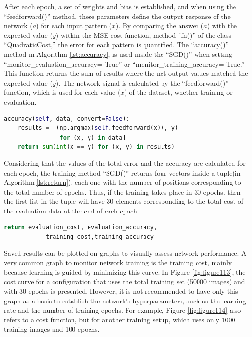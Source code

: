 After each epoch, a set of weights and bias is established, and when using the “feedforward()” method, these parameters define the output response of the network ($a$) for each input pattern ($x$). By comparing the answer ($a$) with the expected value ($y$) within the MSE cost function, method “fn()” of the class “QuadraticCost,” the error for each pattern is quantified. The “accuracy()” method in Algorithm \ref{lst:accuracy}, is used inside the “SGD()” when setting “monitor\_evaluation\_accuracy= True” or “monitor\_training\_accuracy= True.” This function returns the sum of results where the net output values matched the expected value ($y$). The network signal is calculated by the “feedforward()” function, which is used for each value ($x$) of the dataset, whether training or evaluation.

\begin{lstlisting}[caption={accuracy() method in Python},label={lst:accuracy},language=Python]
accuracy(self, data, convert=False):
    results = [(np.argmax(self.feedforward(x)), y) 
                for (x, y) in data]
    return sum(int(x == y) for (x, y) in results)
\end{lstlisting}

Considering that the values of the total error and the accuracy are calculated for each epoch, the training method “SGD()” returns four vectors inside a tuple(in Algorithm \ref{lst:return}), each one with the number of positions corresponding to the total number of epochs. Thus, if the training takes place in 30 epochs, then the first list in the tuple will have 30 elements corresponding to the total cost of the evaluation data at the end of each epoch.

\begin{lstlisting}[caption={Delta method in Python},label={lst:return},language=Python]
return evaluation_cost, evaluation_accuracy,
            training_cost,training_accuracy
\end{lstlisting}

Saved results can be plotted on graphs to visually assess network performance. A very common graph to monitor network training is the training cost, mainly because learning is guided by minimizing this curve. In Figure \ref{fig:figure113}, the cost curve for a configuration that uses the total training set (50000 images) and with 30 epochs is presented. However, it is not recommended to have only this graph as a basis to establish the network's hyperparameters, such as the learning rate and the number of training epochs. For example, Figure \ref{fig:figure114} also refers to a cost function, but for another training setup, which uses only 1000 training images and 100 epochs.

